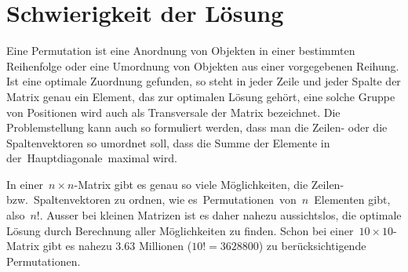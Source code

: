 %
%
%
\section{Schwierigkeit der Lösung
\label{munkres:section:teil2}}

Eine Permutation ist eine Anordnung von Objekten in einer bestimmten Reihenfolge oder eine Umordnung von Objekten aus einer vorgegebenen Reihung.
Ist eine optimale Zuordnung gefunden, so steht in jeder Zeile und jeder Spalte der Matrix genau ein Element, das zur optimalen Lösung gehört, eine solche Gruppe von Positionen wird auch als Transversale der Matrix bezeichnet.
%
Die Problemstellung kann auch so formuliert werden, dass man die Zeilen- oder die Spaltenvektoren so umordnet soll, dass die Summe der Elemente in der Hauptdiagonale maximal wird.

In einer $n\times n$-Matrix gibt es genau so viele Möglichkeiten, die Zeilen- bzw.~Spaltenvektoren zu ordnen, wie es Permutationen von $n$ Elementen gibt, also $n!$.
Ausser bei kleinen Matrizen ist es daher nahezu aussichtslos, die optimale Lösung durch Berechnung aller Möglichkeiten zu finden.
Schon bei einer $10\times 10$-Matrix gibt es nahezu 3.63 Millionen ($10!=3628800$) zu berücksichtigende Permutationen.

